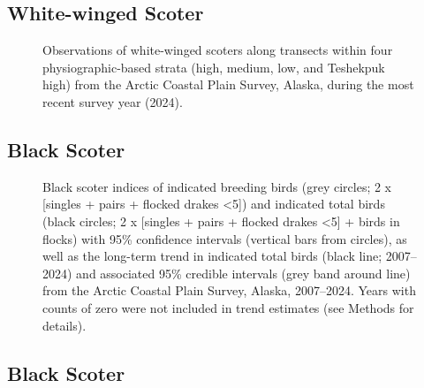 \documentclass[
]{article}
\begin{document}
\newpage{}

\subsection*{White-winged Scoter}\label{white-winged-scoter-2}

\begin{figure}


\caption{\label{fig-WWSCmap}Observations of white-winged scoters along
transects within four physiographic-based strata (high, medium, low, and
Teshekpuk high) from the Arctic Coastal Plain Survey, Alaska, during the
most recent survey year (2024).}

\end{figure}%

\newpage{}

\subsection*{Black Scoter}\label{black-scoter}

\begin{figure}


\caption{\label{fig-BLSC}Black scoter indices of indicated breeding
birds (grey circles; 2 x {[}singles + pairs + flocked drakes
\textless5{]}) and indicated total birds (black circles; 2 x {[}singles
+ pairs + flocked drakes \textless5{]} + birds in flocks) with 95\%
confidence intervals (vertical bars from circles), as well as the
long-term trend in indicated total birds (black line; 2007--2024) and
associated 95\% credible intervals (grey band around line) from the
Arctic Coastal Plain Survey, Alaska, 2007--2024. Years with counts of
zero were not included in trend estimates (see Methods for details).}

\end{figure}%

\newpage{}

\subsection*{Black Scoter}\label{black-scoter-1}
\end{document}
